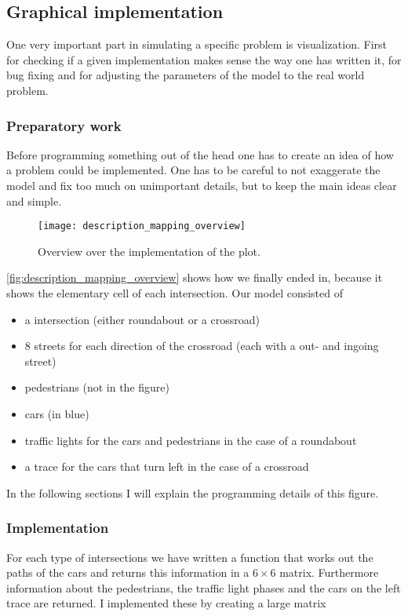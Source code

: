 \graphicspath{{images/}}

\subsection{Graphical implementation}

One very important part in simulating a specific problem is visualization. First for checking if a given implementation makes sense the way one has written it, for bug fixing and for adjusting the parameters of the model to the real world problem.

\subsubsection{Preparatory work}
Before programming something out of the head one has to create an idea of how a problem could be implemented. One has to be careful to not exaggerate the model and fix too much on unimportant details, but to keep the main ideas clear and simple. 

\begin{figure}[htb]
	\centering
		\texttt{[image: description\_mapping\_overview]}
	\caption{Overview over the implementation of the plot.}
	\label{fig:description_mapping_overview}
\end{figure}

\autoref{fig:description_mapping_overview} shows how we finally ended in, because it shows the elementary cell of each intersection. Our model consisted of
\begin{itemize}
	\item a intersection (either roundabout or a crossroad)
	\item 8 streets for each direction of the crossroad (each with a out- and ingoing street)
	\item	pedestrians (not in the figure)
	\item	cars (in blue)
	\item	traffic lights for the cars and pedestrians in the case of a roundabout
	\item a trace for the cars that turn left in the case of a crossroad
\end{itemize}

In the following sections I will explain the programming details of this figure.

\subsubsection{Implementation}
For each type of intersections we have written a function that works out the paths of the cars and returns this information in a $6 \times 6$ matrix. Furthermore information about the pedestrians, the traffic light phases and the cars on the left trace are returned. I implemented these by creating a large matrix


